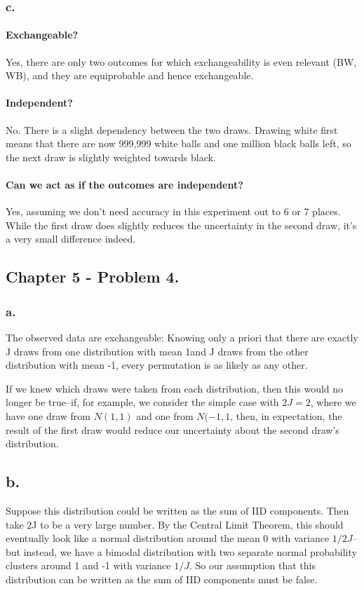 \documentclass{article}
\begin{document}
\subsubsection{c.}

\paragraph{Exchangeable?} Yes, there are only two outcomes for which
exchangeability is even relevant (BW, WB), and they are equiprobable and hence exchangeable. 
\paragraph{Independent?} No. There is a slight dependency between the two draws. Drawing
white first means that there are now 999,999 white balls and one million black balls left,
so the next draw is slightly weighted towards black.
\paragraph{Can we act as if the outcomes are independent?} Yes, assuming we don't
need accuracy in this experiment out to 6 or 7 places. While the first draw does slightly reduces the uncertainty 
in the second draw, it's a very small difference indeed.

\subsection{Chapter 5 - Problem 4.}

\subsubsection{a.} 
The observed data are exchangeable: Knowing only a priori that there are exactly J draws from one
distribution with mean 1and J draws from the other distribution with mean -1, every permutation is as likely as any other.

If we knew which draws were taken from each distribution, then this would no longer be true--if, for example, we consider the simple case with \(2J = 2\), where we have one draw from \(N(1,1)\) and one from \(N(-1,1\), then, in expectation, the result of the first draw would reduce our uncertainty about the second draw's distribution.

\subsection{b.}
Suppose this distribution could be written as the sum of IID components. Then take 2J to be a very large number. By the Central Limit Theorem, this should eventually look like a normal distribution around the mean 0 with variance \(1/2J\)--but instead, we have a bimodal distribution with two separate normal probability clusters around 1 and -1 with variance \(1/J\). So our assumption that this distribution can be written as the sum of IID components must be false.
\end{document}
